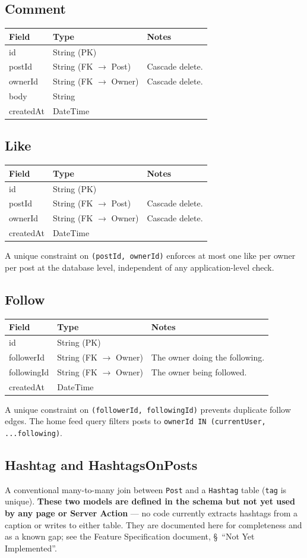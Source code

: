 \documentclass[11pt,a4paper]{article}
\makeatletter
\newcommand{\modeltable}[1]{%
  \begin{tabular}{@{}p{3.3cm}p{2.6cm}p{8.3cm}@{}}
  \toprule
  \textbf{Field} & \textbf{Type} & \textbf{Notes} \\
  \midrule
  #1
  \bottomrule
  \end{tabular}
}
\makeatother
\begin{document}
\subsection{Comment}
\modeltable{
id & String (PK) & \\
postId & String (FK $\to$ Post) & Cascade delete. \\
ownerId & String (FK $\to$ Owner) & Cascade delete. \\
body & String & \\
createdAt & DateTime & \\
}

\subsection{Like}
\modeltable{
id & String (PK) & \\
postId & String (FK $\to$ Post) & Cascade delete. \\
ownerId & String (FK $\to$ Owner) & Cascade delete. \\
createdAt & DateTime & \\
}
A unique constraint on \texttt{(postId, ownerId)} enforces at most one like per owner
per post at the database level, independent of any application-level check.

\subsection{Follow}
\modeltable{
id & String (PK) & \\
followerId & String (FK $\to$ Owner) & The owner doing the following. \\
followingId & String (FK $\to$ Owner) & The owner being followed. \\
createdAt & DateTime & \\
}
A unique constraint on \texttt{(followerId, followingId)} prevents duplicate follow
edges. The home feed query filters posts to
\texttt{ownerId IN (currentUser, ...following)}.

\subsection{Hashtag and HashtagsOnPosts}
A conventional many-to-many join between \texttt{Post} and a \texttt{Hashtag} table
(\texttt{tag} is unique). \textbf{These two models are defined in the schema but not
yet used by any page or Server Action} --- no code currently extracts hashtags from a
caption or writes to either table. They are documented here for completeness and as a
known gap; see the Feature Specification document, \S~``Not Yet Implemented''.
\end{document}
